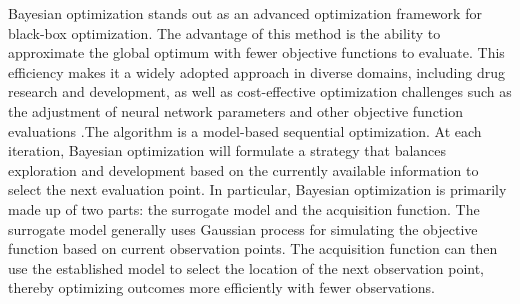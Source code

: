\documentclass{article}
\begin{document}
\hspace{2em}
Bayesian optimization stands out as an advanced optimization framework for  black-box optimization. The advantage of this method is the ability to approximate the global optimum with fewer objective functions to evaluate. This efficiency makes it a widely adopted approach in diverse domains, including drug research and development, as well as cost-effective optimization challenges such as the adjustment of neural network parameters and other objective function evaluations \citep{Shahriari2016taking}.The algorithm is a model-based sequential optimization. At each iteration, Bayesian optimization will formulate a strategy that balances exploration and development based on the currently available information to select the next evaluation point. In particular, Bayesian optimization is primarily made up of two parts: the surrogate model and the acquisition function. The surrogate model generally uses Gaussian process \citep{Rasmussen2005Gaussian} for simulating the objective function based on current observation points. The acquisition function can then use the established model to select the location of the next observation point, thereby optimizing outcomes more efficiently with fewer observations.
\end{document}
